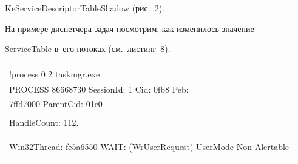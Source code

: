 {\sf KeServiceDescriptorTableShadow} (рис.~2).











  На примере диспетчера задач посмотрим, как изменилось значение 


\mbox{{\sf ServiceTable}} в~его потоках (см.\ листинг~8).


  \begin{table}\small  %


  \begin{center}







  


  \begin{tabular}{|l|}


  \hline


  \\[-9pt]


{\sf !process 0 2 taskmgr.exe}\\


{\sf PROCESS 86668730  SessionId: 1  Cid: 0fb8    Peb:}\\


{\sf 7ffd7000  ParentCid: 01e0}\\


    \hspace*{5mm}{\sf DirBase: 3f021440  ObjectTable: 949e1750}\\


{\sf HandleCount: 112.}\\


    \hspace*{5mm}{\sf Image: taskmgr.exe x}\\


\\


        \hspace*{10mm}{\sf THREAD 86fa1d48  Cid 0fb8.0fbc  Teb: 7ffdf000}\\


{\sf Win32Thread: fe5a6550 WAIT: (WrUserRequest) UserMode Non-Alertable}\\


    \hspace*{15mm}{\sf 85760030  SynchronizationEvent}\\



\end{tabular}
\end{center}
\end{table}
